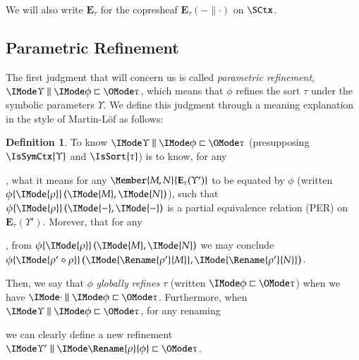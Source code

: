 \documentclass[11pt]{article}
\theoremstyle{definition}
\newtheorem{definition}[thm]{Definition}
\theoremstyle{notation}
\theoremstyle{remark}
\numberwithin{equation}{section}
\newcommand\Exprs{\mathbf{E}}
\begin{document}
We will also write $\Exprs_\tau$ for the copresheaf $\Exprs_\tau(-\parallel\cdot)$ on $\SCtx$.

\subsection{Parametric Refinement}
\label{sec:parametric-refinement}

The first judgment that will concern us is called \emph{parametric refinement},
$\Refines{\Upsilon}{\phi}{\tau}$, which means that $\phi$ refines the sort
$\tau$ under the symbolic parameters $\Upsilon$. We define this judgment
through a meaning explanation in the style of Martin-L\"of as follows:

\newcommand\RefEquate[4]{#1\{\IMode{#2}\}\left(\IMode{#3},\IMode{#4}\right)}

\begin{definition}
  To know $\Refines{\Upsilon}{\phi}{\tau}$ (presupposing $\IsSymCtx{\Upsilon}$
  and $\IsSort{\tau}$) is to know, for any
, what it means for any $\Member{M,N}{\Exprs_\tau(\Upsilon')}$ to be equated by
  $\phi$ (written $\RefEquate{\phi}{\rho}{M}{N}$), such that
  $\RefEquate{\phi}{\rho}{-}{-}$ is a partial equivalence relation (PER) on
  $\Exprs_\tau(\Upsilon')$. Morever, that for any
,
  from $\RefEquate{\phi}{\rho}{M}{N}$ we may conclude
  $\RefEquate{\phi}{\rho'\circ\rho}{\Rename{\rho'}{M}}{\Rename{\rho'}{N}}$.
\end{definition}

Then, we say that $\phi$ \emph{globally refines} $\tau$ (written
$\GloballyRefines{\phi}{\tau}$) when we have $\Refines{\cdot}{\phi}{\tau}$.
Furthermore, when $\Refines{\Upsilon}{\phi}{\tau}$, for any renaming
we can clearly define a new refinement $\Refines{\Upsilon'}{\Rename{\rho}{\phi}}{\tau}$.
\end{document}
